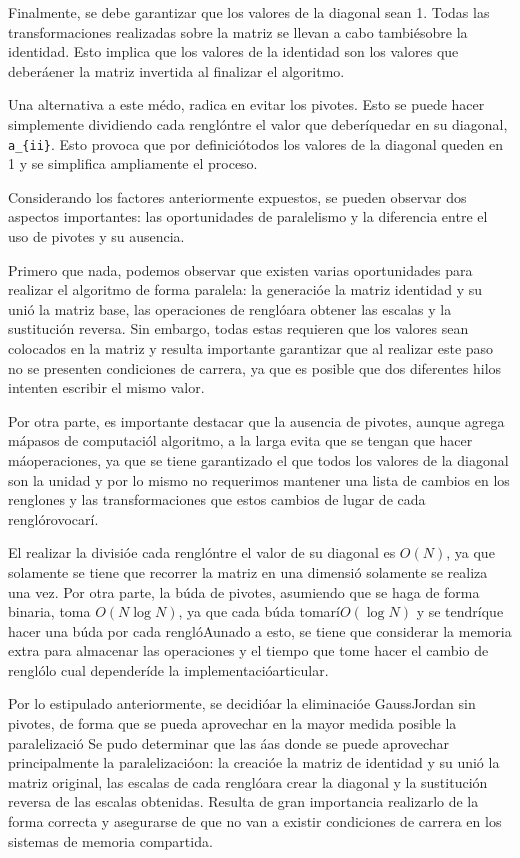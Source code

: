 \documentclass[10pt,letterpaper,oneside]{article}
\begin{document}
{Finalmente, se debe garantizar que los valores de la diagonal sean 1. Todas las transformaciones realizadas sobre la matriz se llevan a cabo tambiésobre la identidad. Esto implica que los valores de la identidad son los valores que deberáener la matriz invertida al finalizar el algoritmo.

Una alternativa a este médo, radica en evitar los pivotes. Esto se puede hacer simplemente dividiendo cada renglóntre el valor que deberíquedar en su diagonal, \verb!a_{ii}!. Esto provoca que por definiciótodos los valores de la diagonal queden en 1 y se simplifica ampliamente el proceso.

Considerando los factores anteriormente expuestos, se pueden observar dos aspectos importantes: las oportunidades de paralelismo y la diferencia entre el uso de pivotes y su ausencia.

Primero que nada, podemos observar que existen varias oportunidades para realizar el algoritmo de forma paralela: la generacióe la matriz identidad y su unió la matriz base, las operaciones de renglóara obtener las escalas y la sustitución reversa. Sin embargo, todas estas requieren que los valores sean colocados en la matriz y resulta importante garantizar que al realizar este paso no se presenten condiciones de carrera, ya que es posible que dos diferentes hilos intenten escribir el mismo valor.

Por otra parte, es importante destacar que la ausencia de pivotes, aunque agrega mápasos de computaciól algoritmo, a la larga evita que se tengan que hacer máoperaciones, ya que se tiene garantizado el que todos los valores de la diagonal son la unidad y por lo mismo no requerimos mantener una lista de cambios en los renglones y las transformaciones que estos cambios de lugar de cada renglórovocarí.

El realizar la divisióe cada renglóntre el valor de su diagonal es $O(N)$, ya que solamente se tiene que recorrer la matriz en una dimensió solamente se realiza una vez. Por otra parte, la búda de pivotes, asumiendo que se haga de forma binaria, toma $O(N\log{}N)$, ya que cada búda tomarí$O(\log{}N)$ y se tendríque hacer una búda por cada renglóAunado a esto, se tiene que considerar la memoria extra para almacenar las operaciones y el tiempo que tome hacer el cambio de renglólo cual dependeríde la implementacióarticular.

Por lo estipulado anteriormente, se decidióar la eliminacióe GaussJordan sin pivotes, de forma que se pueda aprovechar en la mayor medida posible la paralelizació
Se pudo determinar que las áas donde se puede aprovechar principalmente la paralelizacióon: la creacióe la matriz de identidad y su unió la matriz original, las escalas de cada renglóara crear la diagonal y la sustitución reversa de las escalas obtenidas. Resulta de gran importancia realizarlo de la forma correcta y asegurarse de que no van a existir condiciones de carrera en los sistemas de memoria compartida.

}
\end{document}
